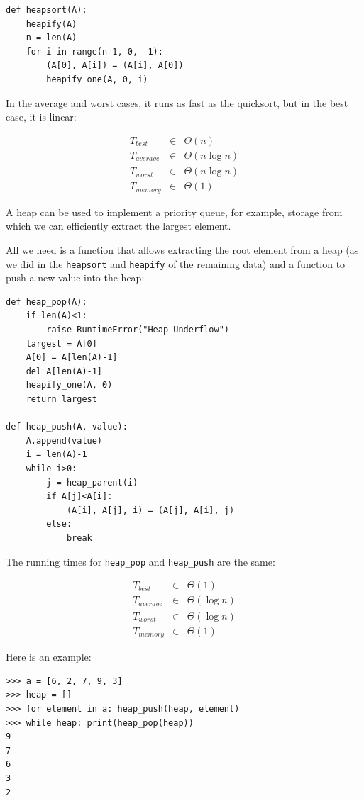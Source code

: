 \documentclass[justified, sixbynine]{tufte-book}
\def\ft{\small\tt}
\theoremstyle{plain}%
\newtheorem * {corollary}{Corollary}
\theoremstyle{definition}
\theoremstyle{remark}
\newtheorem * {remark}{Remark}
\newtheorem * {note}{Note}
\begin{document}
\begin{fullwidth}
\begin{lstlisting}
def heapsort(A):
    heapify(A)
    n = len(A)
    for i in range(n-1, 0, -1):
        (A[0], A[i]) = (A[i], A[0])
        heapify_one(A, 0, i)
\end{lstlisting}

In the average and worst cases, it runs as fast as the quicksort, but in the best case, it is linear:

\begin{eqnarray}
T_{best} &\in &\Theta (n) \\
T_{average} &\in &\Theta (n\log n) \\
T_{worst} &\in &\Theta (n\log n) \\
T_{memory} &\in &\Theta (1)
\end{eqnarray}


A heap can be used to implement a priority queue, for example, storage from which we can efficiently extract the largest element.

All we need is a function that allows extracting the root element from a heap (as we did in the {\ft heapsort} and {\ft heapify} of the remaining data) and a function to push a new value into the heap:

\begin{lstlisting}
def heap_pop(A):
    if len(A)<1:
        raise RuntimeError("Heap Underflow")
    largest = A[0]
    A[0] = A[len(A)-1]
    del A[len(A)-1]
    heapify_one(A, 0)
    return largest

def heap_push(A, value):
    A.append(value)
    i = len(A)-1
    while i>0:
        j = heap_parent(i)
        if A[j]<A[i]:
            (A[i], A[j], i) = (A[j], A[i], j)
        else:
            break
\end{lstlisting}

The running times for {\ft heap\_pop} and {\ft heap\_push} are the same:

\begin{eqnarray}
T_{best} &\in &\Theta (1) \\
T_{average} &\in &\Theta (\log n) \\
T_{worst} &\in &\Theta (\log n) \\
T_{memory} &\in &\Theta (1)
\end{eqnarray}

Here is an example:

\begin{lstlisting}
>>> a = [6, 2, 7, 9, 3]
>>> heap = []
>>> for element in a: heap_push(heap, element)
>>> while heap: print(heap_pop(heap))
9
7
6
3
2
\end{lstlisting}


\end{fullwidth}
\end{document}
